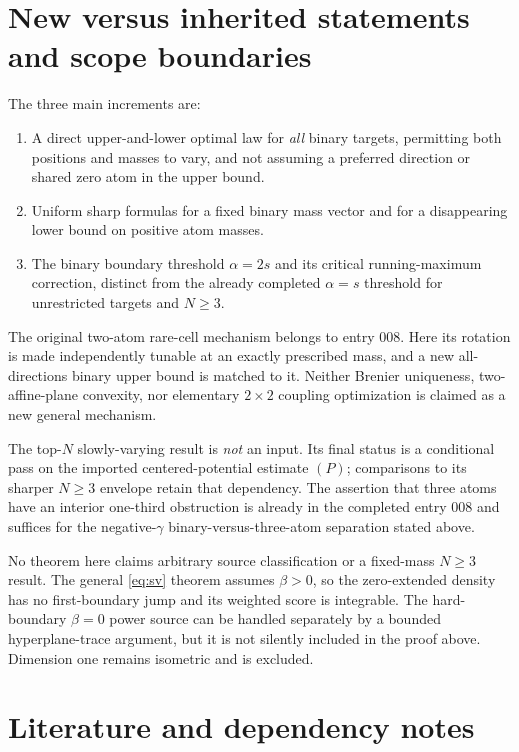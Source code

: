 \section{New versus inherited statements and scope boundaries}

The three main increments are:
\begin{enumerate}
  \item A direct upper-and-lower optimal law for \emph{all} binary targets, permitting both positions and masses to vary, and not assuming a preferred direction or shared zero atom in the upper bound.
  \item Uniform sharp formulas for a fixed binary mass vector and for a disappearing lower bound on positive atom masses.
  \item The binary boundary threshold $\alpha=2s$ and its critical running-maximum correction, distinct from the already completed $\alpha=s$ threshold for unrestricted targets and $N\ge3$.
\end{enumerate}
The original two-atom rare-cell mechanism belongs to entry 008. Here its rotation is made independently tunable at an exactly prescribed mass, and a new all-directions binary upper bound is matched to it. Neither Brenier uniqueness, two-affine-plane convexity, nor elementary $2\times2$ coupling optimization is claimed as a new general mechanism.

The top-$N$ slowly-varying result is \emph{not} an input. Its final status is a conditional pass on the imported centered-potential estimate $(P)$; comparisons to its sharper $N\ge3$ envelope retain that dependency. The assertion that three atoms have an interior one-third obstruction is already in the completed entry 008 and suffices for the negative-$\gamma$ binary-versus-three-atom separation stated above.

No theorem here claims arbitrary source classification or a fixed-mass $N\ge3$ result. The general \eqref{eq:sv} theorem assumes $\beta>0$, so the zero-extended density has no first-boundary jump and its weighted score is integrable. The hard-boundary $\beta=0$ power source can be handled separately by a bounded hyperplane-trace argument, but it is not silently included in the proof above. Dimension one remains isometric and is excluded.

\section{Literature and dependency notes}

